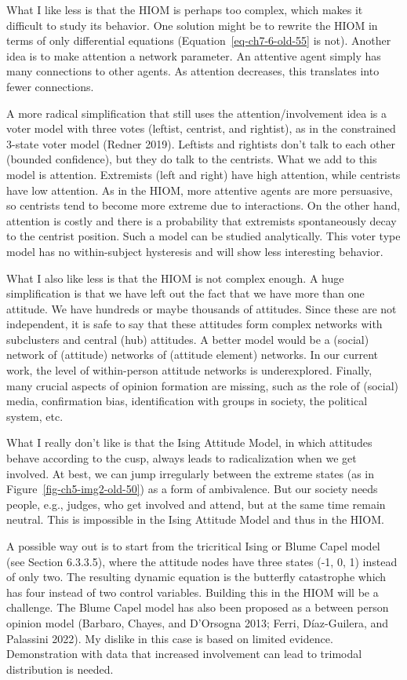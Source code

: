 \documentclass[
  letterpaper,
]{scrbook}
\begin{document}
What I like less is that the HIOM is perhaps too complex, which makes it
difficult to study its behavior. One solution might be to rewrite the
HIOM in terms of only differential equations
(Equation~\ref{eq-ch7-6-old-55} is not). Another idea is to make
attention a network parameter. An attentive agent simply has many
connections to other agents. As attention decreases, this translates
into fewer connections.

A more radical simplification that still uses the attention/involvement
idea is a voter model with three votes (leftist, centrist, and
rightist), as in the constrained 3-state voter model (Redner 2019).
Leftists and rightists don't talk to each other (bounded confidence),
but they do talk to the centrists. What we add to this model is
attention. Extremists (left and right) have high attention, while
centrists have low attention. As in the HIOM, more attentive agents are
more persuasive, so centrists tend to become more extreme due to
interactions. On the other hand, attention is costly and there is a
probability that extremists spontaneously decay to the centrist
position. Such a model can be studied analytically. This voter type
model has no within-subject hysteresis and will show less interesting
behavior.

What I also like less is that the HIOM is not complex enough. A huge
simplification is that we have left out the fact that we have more than
one attitude. We have hundreds or maybe thousands of attitudes. Since
these are not independent, it is safe to say that these attitudes form
complex networks with subclusters and central (hub) attitudes. A better
model would be a (social) network of (attitude) networks of (attitude
element) networks. In our current work, the level of within-person
attitude networks is underexplored. Finally, many crucial aspects of
opinion formation are missing, such as the role of (social) media,
confirmation bias, identification with groups in society, the political
system, etc.

What I really don't like is that the Ising Attitude Model, in which
attitudes behave according to the cusp, always leads to radicalization
when we get involved. At best, we can jump irregularly between the
extreme states (as in Figure~\ref{fig-ch5-img2-old-50}) as a form of
ambivalence. But our society needs people, e.g., judges, who get
involved and attend, but at the same time remain neutral. This is
impossible in the Ising Attitude Model and thus in the HIOM.

A possible way out is to start from the tricritical Ising or Blume Capel
model (see Section 6.3.3.5), where the attitude nodes have three states
(-1, 0, 1) instead of only two. The resulting dynamic equation is the
butterfly catastrophe which has four instead of two control variables.
Building this in the HIOM will be a challenge. The Blume Capel model has
also been proposed as a between person opinion model (Barbaro, Chayes,
and D'Orsogna 2013; Ferri, Díaz-Guilera, and Palassini 2022). My dislike
in this case is based on limited evidence. Demonstration with data that
increased involvement can lead to trimodal distribution is needed.
\end{document}
